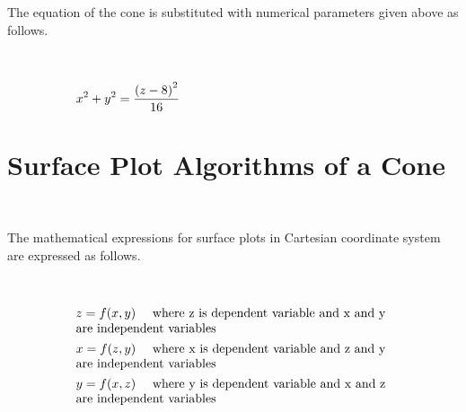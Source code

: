 \documentclass[10pt,a4paper,leqno]{article}
\begin{document}
\begin{CJK*}{UTF8}{gbsn}
\begin{equation}
 \end{equation}
\noindent The equation of the cone is substituted with numerical parameters given above as follows.
 \par \ \par\begin{equation}
 \begin{minipage}{250pt}
                \begin{flushleft} $\displaystyle x^{2} + y^{2} = \frac{\left(z - 8\right)^{2}}{16}$  \end{flushleft}
 \end{minipage}
 \end{equation}
\noindent \section{Surface Plot Algorithms of a Cone }
 \par \ \par\noindent The mathematical expressions for surface plots in Cartesian coordinate system are expressed as follows.
 \par \ \par\begin{equation}
 \begin{minipage}{250pt}
                \begin{flushleft} $\displaystyle z = f{\left(x,y \right)}$  \quad where z is dependent variable and x and y are independent variables \end{flushleft}
 \end{minipage}
 \end{equation}
\begin{equation}
 \begin{minipage}{250pt}
                \begin{flushleft} $\displaystyle x = f{\left(z,y \right)}$  \quad where x is dependent variable and z and y are independent variables \end{flushleft}
 \end{minipage}
 \end{equation}
\begin{equation}
 \begin{minipage}{250pt}
                \begin{flushleft} $\displaystyle y = f{\left(x,z \right)}$  \quad where y is dependent variable and x and z are independent variables \end{flushleft}
 \end{minipage}
 \end{equation}

\end{CJK*}
\end{document}
